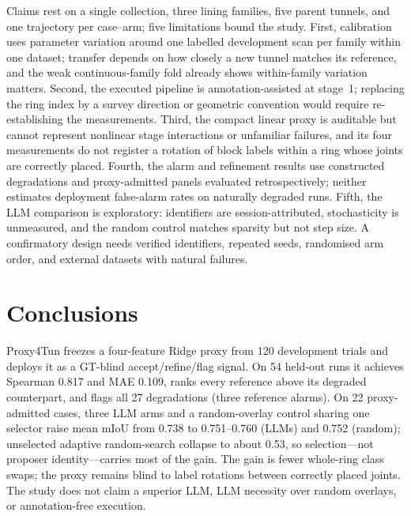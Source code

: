 \documentclass[a4paper,fleqn]{cas-dc}
\begin{document}
Claims rest on a single collection, three lining families, five parent tunnels, and one trajectory per case--arm; five limitations bound the study. First, calibration uses parameter variation around one labelled development scan per family within one dataset; transfer depends on how closely a new tunnel matches its reference, and the weak continuous-family fold already shows within-family variation matters. Second, the executed pipeline is annotation-assisted at stage~1; replacing the ring index by a survey direction or geometric convention would require re-establishing the measurements. Third, the compact linear proxy is auditable but cannot represent nonlinear stage interactions or unfamiliar failures, and its four measurements do not register a rotation of block labels within a ring whose joints are correctly placed. Fourth, the alarm and refinement results use constructed degradations and proxy-admitted panels evaluated retrospectively; neither estimates deployment false-alarm rates on naturally degraded runs. Fifth, the LLM comparison is exploratory: identifiers are session-attributed, stochasticity is unmeasured, and the random control matches sparsity but not step size. A confirmatory design needs verified identifiers, repeated seeds, randomised arm order, and external datasets with natural failures.

\section{Conclusions}\label{sec:conclusions}

Proxy4Tun freezes a four-feature Ridge proxy from 120 development trials and deploys it as a GT-blind accept/refine/flag signal. On 54 held-out runs it achieves Spearman 0.817 and MAE 0.109, ranks every reference above its degraded counterpart, and flags all 27 degradations (three reference alarms). On 22 proxy-admitted cases, three LLM arms and a random-overlay control sharing one selector raise mean mIoU from 0.738 to 0.751--0.760 (LLMs) and 0.752 (random); unselected adaptive random-search collapse to about 0.53, so selection---not proposer identity---carries most of the gain. The gain is fewer whole-ring class swaps; the proxy remains blind to label rotations between correctly placed joints. The study does not claim a superior LLM, LLM necessity over random overlays, or annotation-free execution.

\end{document}
